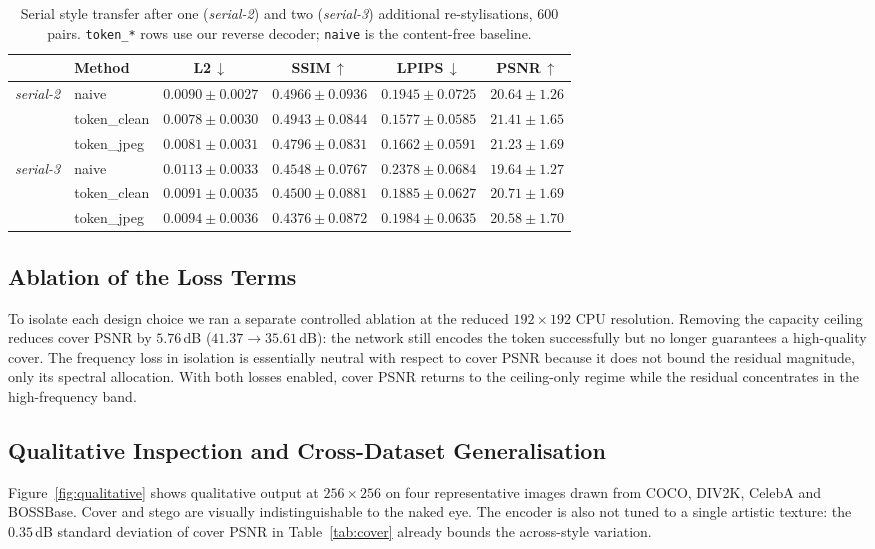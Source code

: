 \documentclass[conference]{IEEEtran}
\begin{document}
\begin{table}[htbp]
\centering
\scriptsize
\caption{Serial style transfer after one (\emph{serial-2}) and two (\emph{serial-3}) additional re-stylisations, $600$ pairs. \texttt{token\_*} rows use our reverse decoder; \texttt{naive} is the content-free baseline.}
\label{tab:serial}
\setlength{\tabcolsep}{2.5pt}
\begin{tabular}{llcccc}
\toprule
& \textbf{Method} & \textbf{L2}\,$\downarrow$ & \textbf{SSIM}\,$\uparrow$ & \textbf{LPIPS}\,$\downarrow$ & \textbf{PSNR}\,$\uparrow$ \\
\midrule
\multirow{3}{*}{\emph{serial-2}}
 & naive       & $0.0090\pm0.0027$ & $0.4966\pm0.0936$ & $0.1945\pm0.0725$ & $20.64\pm1.26$ \\
 & token\_clean & $0.0078\pm0.0030$ & $0.4943\pm0.0844$ & $0.1577\pm0.0585$ & $21.41\pm1.65$ \\
 & token\_jpeg  & $0.0081\pm0.0031$ & $0.4796\pm0.0831$ & $0.1662\pm0.0591$ & $21.23\pm1.69$ \\
\midrule
\multirow{3}{*}{\emph{serial-3}}
 & naive       & $0.0113\pm0.0033$ & $0.4548\pm0.0767$ & $0.2378\pm0.0684$ & $19.64\pm1.27$ \\
 & token\_clean & $0.0091\pm0.0035$ & $0.4500\pm0.0881$ & $0.1885\pm0.0627$ & $20.71\pm1.69$ \\
 & token\_jpeg  & $0.0094\pm0.0036$ & $0.4376\pm0.0872$ & $0.1984\pm0.0635$ & $20.58\pm1.70$ \\
\bottomrule
\end{tabular}
\end{table}

\subsection{Ablation of the Loss Terms}
To isolate each design choice we ran a separate controlled ablation at the reduced $192\!\times\!192$ CPU resolution. Removing the capacity ceiling reduces cover PSNR by $5.76$\,dB ($41.37\!\to\!35.61$\,dB): the network still encodes the token successfully but no longer guarantees a high-quality cover. The frequency loss in isolation is essentially neutral with respect to cover PSNR because it does not bound the residual magnitude, only its spectral allocation. With both losses enabled, cover PSNR returns to the ceiling-only regime while the residual concentrates in the high-frequency band.

\subsection{Qualitative Inspection and Cross-Dataset Generalisation}
Figure~\ref{fig:qualitative} shows qualitative output at $256\!\times\!256$ on four representative images drawn from COCO, DIV2K, CelebA and BOSSBase. Cover and stego are visually indistinguishable to the naked eye. The encoder is also not tuned to a single artistic texture: the $0.35$\,dB standard deviation of cover PSNR in Table~\ref{tab:cover} already bounds the across-style variation.
\end{document}
